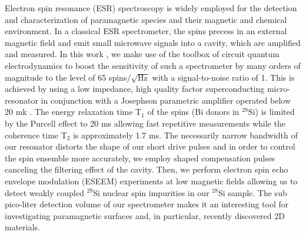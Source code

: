 Electron spin resonance (ESR) spectroscopy is widely employed for the detection and characterization of paramagnetic species and their magnetic and chemical environment. In a classical ESR spectrometer, the spins precess in an external magnetic field and emit small microwave signals into a cavity, which are amplified and measured. In this work \cite{Probst_2017}, we make use of the toolbox of circuit quantum electrodynamics to boost the sensitivity of such a spectrometer by many orders of magnitude to the level of 65 spins/$\sqrt{\text{Hz}}$ with a signal-to-noise ratio of 1.
This is achieved by using a low impedance, high quality factor superconducting micro-resonator in conjunction with a Josephson parametric amplifier operated below 20 mk \cite{Bienfait_2015}. The energy relaxation time T$_1$ of the spins (Bi donors in $^{28}$Si) is limited by the Purcell effect to 20 ms allowing fast repetitive measurements while the coherence time T$_2$ is approximately 1.7 ms. 
The necessarily narrow bandwidth of our resonator distorts the shape of our short drive pulses and in order to control the spin ensemble more accurately, we employ shaped compensation pulses canceling the filtering effect of the cavity. Then, we perform electron spin echo envelope modulation (ESEEM) experiments at low magnetic fields allowing us to detect weakly coupled $^{29}$Si nuclear spin impurities in our $^{28}$Si sample.
The sub pico-liter detection volume of our spectrometer makes it an interesting tool for investigating paramagnetic surfaces and, in particular, recently discovered 2D materials.